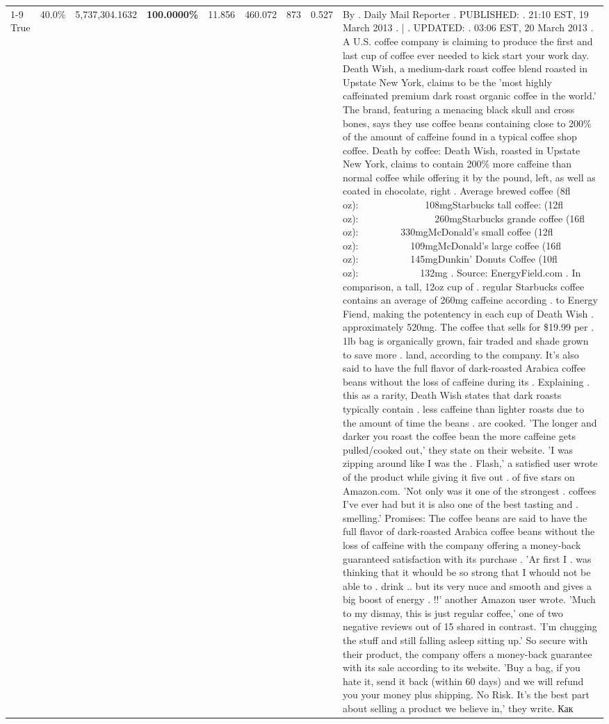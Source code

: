 \begin{table}[H]
{\begin{tabular}{lllrlllll}
\cline{1-9}
True & 40.0\% & 5,737,304.1632 & \bfseries \color{red} 100.0000\% & 11.856 & 460.072 & 873 & 0.527 & By . Daily Mail Reporter . PUBLISHED: . 21:10 EST, 19 March 2013 . | . UPDATED: . 03:06 EST, 20 March 2013 . A U.S. coffee company is claiming to produce the first and last cup of coffee ever needed to kick start your work day. Death Wish, a medium-dark roast coffee blend roasted in Upstate New York, claims to be the 'most highly caffeinated premium dark roast organic coffee in the world.' The brand, featuring a menacing black skull and cross bones, says they use coffee beans containing close to 200\% of the amount of caffeine found in a typical coffee shop coffee. Death by coffee: Death Wish, roasted in Upstate New York, claims to contain 200\% more caffeine than normal coffee while offering it by the pound, left, as well as coated in chocolate, right . Average brewed coffee (8fl oz):              108mgStarbucks tall coffee: (12fl oz):                260mgStarbucks grande coffee (16fl oz):         330mgMcDonald's small coffee (12fl oz):           109mgMcDonald's large coffee (16fl oz):           145mgDunkin' Donuts Coffee (10fl oz):             132mg . Source: EnergyField.com . In comparison, a tall, 12oz cup of . regular Starbucks coffee contains an average of 260mg caffeine according . to Energy Fiend, making the potentency in each cup of Death Wish . approximately 520mg. The coffee that sells for \$19.99 per . 1lb bag is organically grown, fair traded and shade grown to save more . land, according to the company. It's also said to have the full flavor of dark-roasted Arabica coffee beans without the loss of caffeine during its . Explaining . this as a rarity, Death Wish states that dark roasts typically contain . less caffeine than lighter roasts due to the amount of time the beans . are cooked. 'The longer and darker you roast the coffee bean the more caffeine gets pulled/cooked out,' they state on their website. 'I was zipping around like I was the . Flash,' a satisfied user wrote of the product while giving it five out . of five stars on Amazon.com. 'Not only was it one of the strongest . coffees I've ever had but it is also one of the best tasting and . smelling.’ Promises: The coffee beans are said to have the full flavor of dark-roasted Arabica coffee beans without the loss of caffeine with the company offering a money-back guaranteed satisfaction with its purchase . 'Ar first I . was thinking that it whould be so strong that I whould not be able to . drink .. but its very nuce and smooth and gives a big boost of energy . !!' another Amazon user wrote. 'Much to my dismay, this is just regular coffee,' one of two negative reviews out of 15 shared in contrast. 'I'm chugging the stuff and still falling asleep sitting up.' So secure with their product, the company offers a money-back guarantee with its sale according to its website. 'Buy a bag, if you hate it, send it back (within 60 days) and we will refund you your money plus shipping. No Risk. It’s the best part about selling a product we believe in,' they write. Как \\

\end{tabular}}
\end{table}
